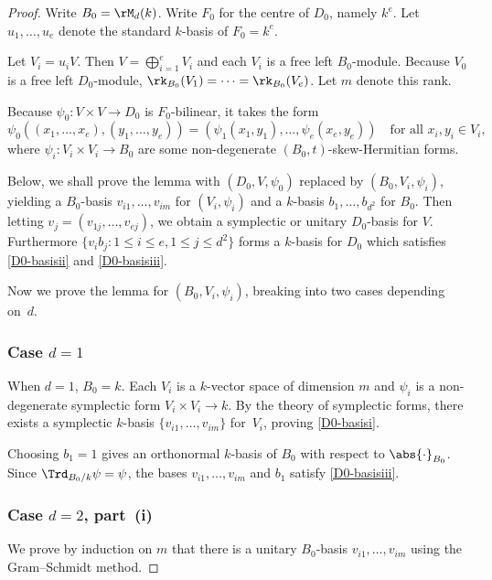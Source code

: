 \begin{proof}
Write $B_0 = \rM_d(k)$.
Write $F_0$ for the centre of $D_0$, namely $k^e$.
Let $u_1, \dotsc, u_e$ denote the standard $k$-basis of $F_0 = k^e$.

Let $V_i = u_i V$.
Then $V = \bigoplus_{i=1}^e V_i$ and each $V_i$ is a free left $B_0$-module.
Because $V_0$ is a free left $D_0$-module, $\rk_{B_0}(V_1) = \dotsb = \rk_{B_0}(V_e)$.
Let $m$ denote this rank.

Because $\psi_0 : V \times V \to D_0$ is $F_0$-bilinear, it takes the form
\[
\psi_0((x_1, \dotsc, x_e), (y_1, \dotsc, y_e)) = (\psi_1(x_1, y_1), \dotsc, \psi_e(x_e, y_e)) \quad\text{for all } x_i, y_i \in V_i,
\]
where $\psi_i \colon V_i \times V_i \to B_0$ are some non-degenerate $(B_0, t)$-skew-Hermitian forms.

Below, we shall prove the lemma with $(D_0, V, \psi_0)$ replaced by $(B_0, V_i, \psi_i)$, yielding a $B_0$-basis $v_{i1}, \dotsc, v_{im}$ for $(V_i, \psi_i)$ and a $k$-basis $b_1, \dotsc, b_{d^2}$ for $B_0$.
Then letting \hbox{$v_j = (v_{1j}, \dotsc, v_{ej})$}, we obtain a symplectic or unitary $D_0$-basis for $V$.
Furthermore $\{ v_i b_j : 1 \leq i \leq e, 1 \leq j \leq d^2 \}$ forms a $k$-basis for $D_0$ which satisfies \eqref{D0-basisii} and \eqref{D0-basisiii}.

Now we prove the lemma for $(B_0, V_i, \psi_i)$, breaking into two cases depending on~$d$.

\subsubsection*{Case $d=1$}
When $d=1$, $B_0=k$.
Each $V_i$ is a $k$-vector space of dimension $m$ and $\psi_i$ is a non-degenerate symplectic form $V_i \times V_i \to k$.
By the theory of symplectic forms, there exists a symplectic $k$-basis $\{ v_{i1}, \dotsc, v_{im} \}$ for~$V_i$, proving \eqref{D0-basisi}.

Choosing $b_1 = 1$ gives an orthonormal $k$-basis of $B_0$ with respect to $\abs{\cdot}_{B_0}$.
Since $\Trd_{B_0/k} \psi = \psi$, the bases $v_{i1}, \dotsc, v_{im}$ and $b_1$ satisfy \eqref{D0-basisiii}.

\subsubsection*{Case $d=2$, part~(i)}
We prove by induction on $m$ that there is a unitary $B_0$-basis $v_{i1}, \dotsc, v_{im}$ using the Gram--Schmidt method.


\end{proof}
